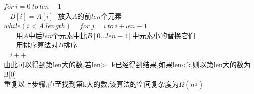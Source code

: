 \documentclass[19pt,a4paper]{article}
\begin{document}
\indent $for\ i=0\ to\ len-1$\\
\indent $\ \ \ \ B[i]=A[i]\ \ \ 放入A的前len个元素$\\
\indent $while(i<A.length)$
\indent $\ \ \ \ for\ j=i\ to\ i+len-1$\\
\indent $\ \ \ \ \ \ \ \ 用A中后len个元素中比B[0...len-1]中元素小的替换它们$\\
\indent $\ \ \ \ \ \ \ \  用排序算法对B排序$\\
\indent $\ \ \ \ i++$\\
\indent 由此可以得到第len大的数,若len>=k已经得到结果,如果len<k,则以第len大的数为B[0]\\
\indent 重复以上步骤,直至找到第k大的数,该算法的空间复杂度为$\Omega(n^{\frac{1}{2}})$\\
\end{document}
